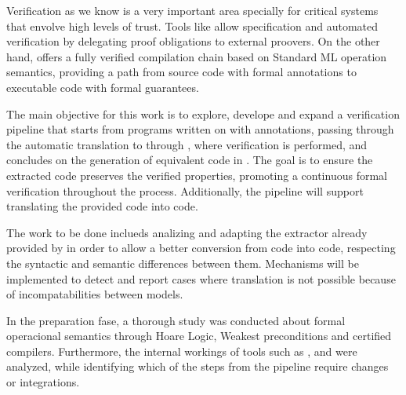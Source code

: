 
%


Verification as we know is a very important area specially for critical systems that envolve high levels of trust. Tools
like \whythree allow specification and automated verification by delegating proof obligations to external proovers. On the other
hand, \cml offers a fully verified compilation chain based on Standard ML operation semantics, providing a path from source code 
with formal annotations to executable code with formal guarantees.

The main objective for this work is to explore, develope and expand a verification pipeline that starts from programs written
on \ocaml with \gospel annotations, passing through the automatic translation to \whyml through \cameleer, where verification 
is performed, and concludes on the generation of equivalent code in \cml. The goal is to ensure the extracted code preserves 
the verified properties, promoting a continuous formal verification throughout the process. Additionally, the pipeline will 
support translating the provided \cml code into \ocaml code.

The work to be done inclueds analizing and adapting the extractor already provided by \cameleer in order to allow a better 
conversion from \ocaml code into \cml code, respecting the syntactic and semantic differences between them. Mechanisms will be
implemented to detect and report cases where translation is not possible because of incompatabilities between models.

In the preparation fase, a thorough study was conducted about formal operacional semantics through Hoare Logic,
Weakest preconditions and certified compilers. Furthermore, the internal workings of tools such as \whythree, \cameleer 
and \cakeml were analyzed, while identifying which of the steps from the pipeline require changes or integrations.

